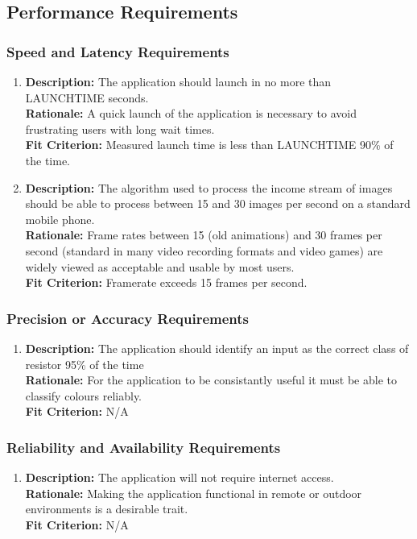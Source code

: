\documentclass{article}
\begin{document}
\subsection{Performance Requirements}
\subsubsection{Speed and Latency Requirements}
\begin{enumerate}
\item \textbf{Description: }The application should launch in no more than LAUNCHTIME seconds.
\\ \textbf{Rationale: } A quick launch of the application is necessary to avoid frustrating users with long wait times.
\\ \textbf{Fit Criterion:} Measured launch time is less than LAUNCHTIME 90\% of the time.
\item \textbf{Description: } The algorithm used to process the income stream of images should be able to process between 15 and 30 images per second on a standard mobile phone.
\\ \textbf{Rationale: } Frame rates between 15 (old animations) and 30 frames per second (standard in many video recording formats and video games) are widely viewed as acceptable and usable by most users.
\\ \textbf{Fit Criterion:} Framerate exceeds 15 frames per second.
\end{enumerate}
\subsubsection{Precision or Accuracy Requirements}
\begin{enumerate}
\item \textbf{Description: } The application should identify an input as the correct class of resistor 95\% of the time
\\ \textbf{Rationale: } For the application to be consistantly useful it must be able to classify colours reliably.
\\ \textbf{Fit Criterion:} N/A
\end{enumerate}

\subsubsection{Reliability and Availability Requirements}
\begin{enumerate}
\item \textbf{Description: } The application will not require internet access.
\\ \textbf{Rationale: } Making the application functional in remote or outdoor environments is a desirable trait.
\\ \textbf{Fit Criterion:} N/A
\end{enumerate}
\end{document}
